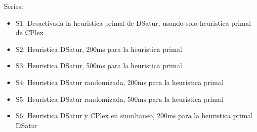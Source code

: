 \documentclass[landscape, 12pt]{report}
\begin{document}
Series:
\begin{itemize}
\item S1: Desactivada la heuristica primal de DSatur, usando solo heuristica primal de CPlex %
\item S2: Heuristica DSatur, 200ms para la heuristica primal %
\item S3: Heuristica DSatur, 500ms para la heuristica primal%
\item S4: Heuristica DSatur randomizada, 200ms para la heuristica primal %
\item S5: Heuristica DSatur randomizada, 500ms para la heuristica primal %
\item S6: Heuristica DSatur y CPlex en simultaneo, 200ms para la heuristica primal DSatur%
\end{itemize}
\end{document}
